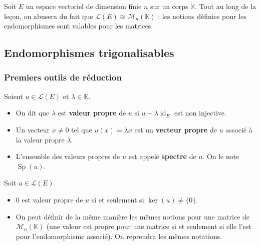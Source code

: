 




  Soit $E$ un espace vectoriel de dimension finie $n$ sur un corps $\mathbb{K}$. Tout au long de la leçon, on abusera du fait que $\mathcal{L}(E) \cong \mathcal{M}_n(\mathbb{K})$ : les notions définies pour les endomorphismes sont valables pour les matrices.

  \subsection{Endomorphismes trigonalisables}

  \subsubsection{Premiers outils de réduction}


  \begin{definition}
    Soient $u \in \mathcal{L}(E)$ et $\lambda \in \mathbb{K}$.
    \begin{itemize}
      \item On dit que $\lambda$ est \textbf{valeur propre} de $u$ si $u - \lambda \operatorname{id}_E$ est non injective.
      \item Un vecteur $x \neq 0$ tel que $u(x) = \lambda x$ est un \textbf{vecteur propre} de $u$ associé à la valeur propre $\lambda$.
      \item L'ensemble des valeurs propres de $u$ est appelé \textbf{spectre} de $u$. On le note $\operatorname{Sp}(u)$.
    \end{itemize}
  \end{definition}

  \begin{remark}
    Soit $u \in \mathcal{L}(E)$.
    \begin{itemize}
      \item $0$ est valeur propre de $u$ si et seulement si $\ker(u) \neq \{ 0 \}$.
      \item On peut définir de la même manière les mêmes notions pour une matrice de $\mathcal{M}_n(\mathbb{K})$ (une valeur est propre pour une matrice si et seulement si elle l'est pour l'endomorphisme associé). On reprendra les mêmes notations.
    \end{itemize}
  \end{remark}

